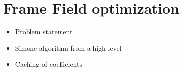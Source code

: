 \documentclass[../thesis.tex]{subfiles}
\begin{document}
\chapter{Frame Field optimization}
\label{ch:optimization}

\begin{itemize}
    \item Problem statement
    \item Simone algorithm from a high level
    \item Caching of coefficients
\end{itemize}
\end{document}
